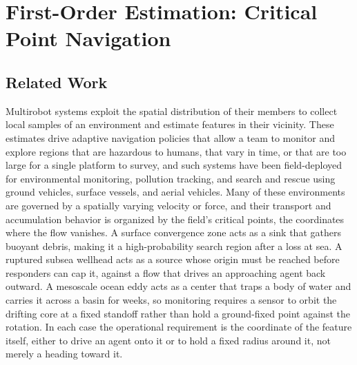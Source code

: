 \documentclass[12pt, letterpaper, oneside]{report}
\begin{document}
\chapter{First-Order Estimation: Critical Point Navigation}
\label{ch:vector_field}

\section{Related Work}
\label{sec:vf_related_work}

Multirobot systems exploit the spatial distribution of their members to
collect local samples of an environment and estimate features in their
vicinity. These estimates drive adaptive navigation policies that allow a
team to monitor and explore regions that are hazardous to humans, that vary
in time, or that are too large for a single platform to survey, and such
systems have been field-deployed for environmental monitoring, pollution
tracking, and search and rescue using ground vehicles, surface vessels, and
aerial vehicles. Many of these environments are governed by a spatially
varying velocity or force, and their transport and accumulation behavior is
organized by the field's critical points, the coordinates where the flow
vanishes. A surface convergence zone acts as a sink that gathers buoyant
debris, making it a high-probability search region after a loss at sea. A
ruptured subsea wellhead acts as a source whose origin must be reached
before responders can cap it, against a flow that drives an approaching
agent back outward. A mesoscale ocean eddy acts as a center that traps a
body of water and carries it across a basin for weeks, so monitoring
requires a sensor to orbit the drifting core at a fixed standoff rather than
hold a ground-fixed point against the rotation. In each case the operational
requirement is the coordinate of the feature itself, either to drive an
agent onto it or to hold a fixed radius around it, not merely a heading
toward it.
\end{document}
